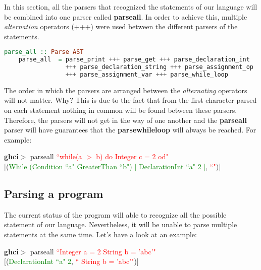 \documentclass[a4paper, onecolumn]{article}
\begin{document}
    In this section, all the parsers that recognized the statements of our language will be combined into one parser called \textbf{parse\textunderscore all}. In order to achieve this, multiple \textit{alternation} operators (+++) were used between the different parsers of the statements.
    
    \begin{tcolorbox}
    \begin{lstlisting}[language=Haskell] 
    parse_all :: Parse AST
    parse_all  = parse_print +++ parse_get +++ parse_declaration_int 
                 +++ parse_declaration_string +++ parse_assignment_op 
                 +++ parse_assignment_var +++ parse_while_loop
    \end{lstlisting}
    \end{tcolorbox}
    
    \noindent The order in which the parsers are arranged between the \textit{alternating} operators will not matter. Why? This is due to the fact that from the first character parsed on each statement nothing in common will be found between these parsers. Therefore, the parsers will not get in the way of one another and the \textbf{parse\textunderscore all} parser will have guarantees that the \textbf{parse\textunderscore while\textunderscore loop} will always be reached. For example:
    
    \begin{center}
            \textbf{ghci$>$} parse\textunderscore all \textcolor{red}{``while(a $>$ b) do Integer c = 2 od"} \\
             $\big[$(\textcolor{green}{While (Condition ``a" GreaterThan ``b") $\big[$ DeclarationInt ``a" 2 $\big]$}, \textcolor{red}{``"})$\big]$
        \end{center}
    
    
    \subsection{Parsing a program}
    
    The current status of the program will able to recognize all the possible statement of our language. Nevertheless, it will be unable to parse multiple statements at the same time. Let's have a look at an example: 
    
    \begin{center}
            \textbf{ghci$>$} parse\textunderscore all \textcolor{red}{``Integer a = 2 String b = 'abc'"} \\
             $\big[$(\textcolor{green}{DeclarationInt ``a" 2}, \textcolor{red}{`` String b = 'abc'"})$\big]$
        \end{center}
        
\end{document}
